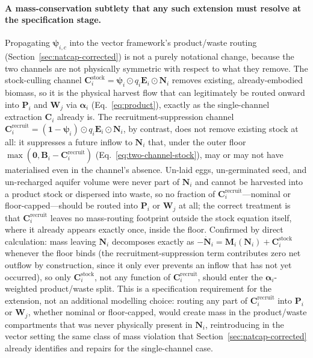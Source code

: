 \documentclass[twocolumn,10pt]{article}
\begin{document}
\paragraph{A mass-conservation subtlety that any such extension must resolve at the specification stage.} Propagating $\boldsymbol\psi_{i,c}$ into the vector framework's product/waste routing (Section~\ref{sec:natcap-corrected}) is not a purely notational change, because the two channels are not physically symmetric with respect to what they remove. The stock-culling channel $\mathbf C^{\text{stock}}_i=\boldsymbol\psi_i\odot q_i\mathbf E_i\odot\mathbf N_i$ removes existing, already-embodied biomass, so it is the physical harvest flow that can legitimately be routed onward into $\mathbf P_i$ and $\mathbf W_j$ via $\boldsymbol\alpha_i$ (Eq.~\eqref{eq:product}), exactly as the single-channel extraction $\mathbf C_i$ already is. The recruitment-suppression channel $\mathbf C^{\text{recruit}}_i=(\mathbf 1-\boldsymbol\psi_i)\odot q_i\mathbf E_i\odot\mathbf N_i$, by contrast, does not remove existing stock at all: it suppresses a future inflow to $\mathbf N_i$ that, under the outer floor $\max(\mathbf 0,\mathbf B_i-\mathbf C^{\text{recruit}}_i)$ (Eq.~\eqref{eq:two-channel-stock}), may or may not have materialised even in the channel's absence. Un-laid eggs, un-germinated seed, and un-recharged aquifer volume were never part of $\mathbf N_i$ and cannot be harvested into a product stock or dispersed into waste, so no fraction of $\mathbf C^{\text{recruit}}_i$---nominal or floor-capped---should be routed into $\mathbf P_i$ or $\mathbf W_j$ at all; the correct treatment is that $\mathbf C^{\text{recruit}}_i$ leaves no mass-routing footprint outside the stock equation itself, where it already appears exactly once, inside the floor. Confirmed by direct calculation: mass leaving $\mathbf N_i$ decomposes exactly as $-\dot{\mathbf N}_i=\mathbf M_i(\mathbf N_i)+\mathbf C^{\text{stock}}_i$ whenever the floor binds (the recruitment-suppression term contributes zero net outflow by construction, since it only ever prevents an inflow that has not yet occurred), so only $\mathbf C^{\text{stock}}_i$, not any function of $\mathbf C^{\text{recruit}}_i$, should enter the $\boldsymbol\alpha_i$-weighted product/waste split. This is a specification requirement for the extension, not an additional modelling choice: routing any part of $\mathbf C^{\text{recruit}}_i$ into $\mathbf P_i$ or $\mathbf W_j$, whether nominal or floor-capped, would create mass in the product/waste compartments that was never physically present in $\mathbf N_i$, reintroducing in the vector setting the same class of mass violation that Section~\ref{sec:natcap-corrected} already identifies and repairs for the single-channel case.
\end{document}
